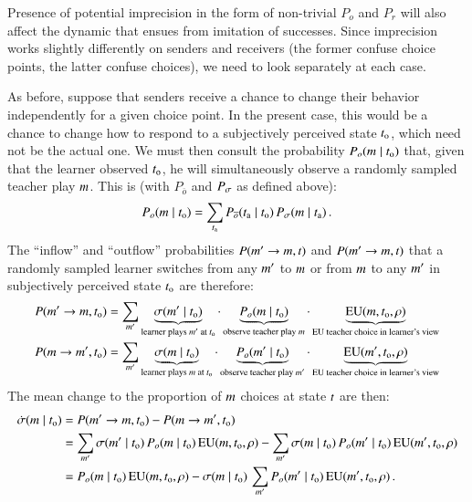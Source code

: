 \documentclass[fleqn,reqno,10pt]{article}
\begin{document}
Presence of potential imprecision in the form of non-trivial $P_o$ and $P_r$ will also affect
the dynamic that ensues from imitation of successes. Since imprecision works slightly
differently on senders and receivers (the former confuse choice points, the latter confuse
choices), we need to look separately at each case.

As before, suppose that senders receive a chance to change their behavior independently for a
given choice point. In the present case, this would be a chance to change how to respond to a
subjectively perceived state $t_{\mathrm{o}}$, which need not be the actual one. We must then
consult the probability $P_o(m \mid t_{\mathrm{o}})$ that, given that the learner
observed $t_{\mathrm{o}}$, he will simultaneously observe a randomly sampled teacher play
$m$. This is (with $P_{\overline{o}}$ and $P_{\sigma}$ as defined above):
\begin{align*}
  P_o(m \mid t_{\mathrm{o}}) = \sum_{t_{\mathrm{a}}} P_{\overline{o}}(t_{\mathrm{a}}
  \mid t_{\mathrm{o}}) \thinspace P_{\sigma}(m \mid t_{\mathrm{a}})\,.
\end{align*}
The ``inflow'' and ``outflow'' probabilities $P(m' \rightarrow m, t)$ and
$P(m' \rightarrow m, t)$ that a randomly sampled learner switches from any
$m'$ to $m$ or from $m$ to any $m'$ in subjectively perceived state
$t_{\mathrm{o}}$ are therefore:
\begin{align*}
  P(m' \rightarrow m, t_{\mathrm{o}}) & = \sum_{m'} \underbrace{\sigma(m' \mid
    t_{\mathrm{o}})}_{\text{learner plays $m'$ at $t_{\mathrm{o}}$}} \cdot
  \underbrace{P_{o}(m \mid t_{\mathrm{o}})}_{\text{observe teacher play $m$}} \cdot
  \underbrace{\mathrm{EU}(m, t_{\mathrm{o}}, \rho)}_{\text{EU teacher choice in learner's view}}
  \\
  P(m \rightarrow m', t_{\mathrm{o}}) & = \sum_{m'} \underbrace{\sigma(m \mid
    t_{\mathrm{o}})}_{\text{learner plays $m$ at $t_{\mathrm{o}}$}} \cdot
  \underbrace{P_{o}(m' \mid t_{\mathrm{o}})}_{\text{observe teacher play $m'$}} \cdot
  \underbrace{\mathrm{EU}(m', t_{\mathrm{o}}, \rho)}_{\text{EU teacher choice in learner's view}}
\end{align*}
The mean change to the proportion of $m$ choices at state $t$ are then:
\begin{align}
  \label{eq:nRDSender}
  \dot{\sigma}(m \mid t_{\mathrm{o}}) & = P(m' \rightarrow m, t_{\mathrm{o}}) - P(m
  \rightarrow m', t_{\mathrm{o}}) \nonumber \\
  & = \sum_{m'} \sigma(m' \mid t_{\mathrm{o}}) \thinspace P_o(m \mid
  t_{\mathrm{o}}) \thinspace \mathrm{EU}(m, t_{\mathrm{o}}, \rho) - \sum_{m'} \sigma(m \mid t_{\mathrm{o}}) \thinspace
  P_o(m' \mid t_{\mathrm{o}}) \thinspace \mathrm{EU}(m', t_{\mathrm{o}}, \rho) \nonumber \\
  & = P_o(m \mid t_{\mathrm{o}}) \thinspace \mathrm{EU}(m, t_{\mathrm{o}}, \rho) - \sigma(m \mid t_{\mathrm{o}}) \thinspace \sum_{m'} P_o(m' \mid t_{\mathrm{o}}) \thinspace \mathrm{EU}(m', t_{\mathrm{o}}, \rho)\,.
\end{align}
\end{document}
